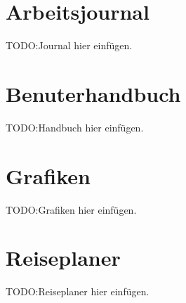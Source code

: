 \section*{Arbeitsjournal}
\label{sec:anhang:journal}
TODO:\@ Journal hier einfügen.

\section*{Benuterhandbuch}
\label{sec:anhang:handbuch}
TODO:\@ Handbuch hier einfügen.

\section*{Grafiken}
\label{sec:anhang:grafiken}
TODO:\@ Grafiken hier einfügen.

\section*{Reiseplaner}
\label{sec:anhang:reiseplaner}
TODO:\@ Reiseplaner hier einfügen.
